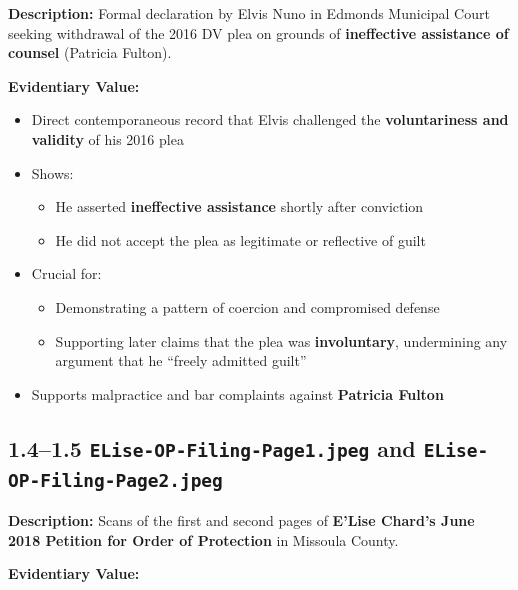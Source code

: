 \documentclass[11pt, letterpaper]{article}
\begin{document}
\textbf{Description:} Formal declaration by Elvis Nuno in Edmonds Municipal Court seeking withdrawal of the 2016 DV plea on grounds of \textbf{ineffective assistance of counsel} (Patricia Fulton).

\textbf{Evidentiary Value:}

\begin{itemize}[leftmargin=*]
  \item Direct contemporaneous record that Elvis challenged the \textbf{voluntariness and validity} of his 2016 plea
  \item Shows:
    \begin{itemize}
      \item He asserted \textbf{ineffective assistance} shortly after conviction
      \item He did not accept the plea as legitimate or reflective of guilt
    \end{itemize}
  \item Crucial for:
    \begin{itemize}
      \item Demonstrating a pattern of coercion and compromised defense
      \item Supporting later claims that the plea was \textbf{involuntary}, undermining any argument that he ``freely admitted guilt''
    \end{itemize}
  \item Supports malpractice and bar complaints against \textbf{Patricia Fulton}
\end{itemize}

\subsection{1.4--1.5 \texttt{ELise-OP-Filing-Page1.jpeg} and \texttt{ELise-OP-Filing-Page2.jpeg}}

\textbf{Description:} Scans of the first and second pages of \textbf{E'Lise Chard's June 2018 Petition for Order of Protection} in Missoula County.

\textbf{Evidentiary Value:}
\end{document}
